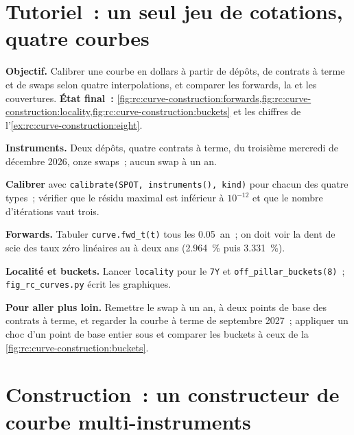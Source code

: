 \section{Tutoriel~: un seul jeu de cotations, quatre courbes}\label{tut:rc:curve-construction:tutorial}

\begin{tutorial}
\textbf{Objectif.} Calibrer une courbe en dollars à partir de dépôts, de contrats à terme et de swaps
selon quatre interpolations, et comparer les forwards, la  et les couvertures.
\textbf{État final~:}
\cref{fig:rc:curve-construction:forwards,fig:rc:curve-construction:locality,fig:rc:curve-construction:buckets}
et les chiffres de l'\cref{ex:rc:curve-construction:eight}.
\begin{tutsteps}
\item \textbf{Instruments.} Deux dépôts, quatre contrats à terme, du troisième
mercredi de décembre 2026, onze swaps~; aucun swap à un an.
\label{lst:rc:curve-construction:instruments}
\item \textbf{Calibrer} avec \texttt{calibrate(SPOT, instruments(), kind)} pour chacun
des quatre types~; vérifier que le résidu maximal est inférieur à $10^{-12}$ et que le
nombre d'itérations vaut trois.
\item \textbf{Forwards.} Tabuler \texttt{curve.fwd\_t(t)} tous les 0.05~an~; on
doit voir la dent de scie des taux zéro linéaires au  à deux ans (2.964~\% puis
3.331~\%).
\item \textbf{Localité et buckets.} Lancer \texttt{locality} pour le  \texttt{7Y} et
\texttt{off\_pillar\_buckets(8)}~; \texttt{fig\_rc\_curves.py} écrit les graphiques.
\end{tutsteps}
\textbf{Pour aller plus loin.} Remettre le swap à un an, à deux points de base
des contrats à terme, et regarder la courbe à terme de septembre 2027~; appliquer un choc d'un point de base entier
sous  et comparer les buckets à ceux de
la \cref{fig:rc:curve-construction:buckets}.
\end{tutorial}

\section{Construction~: un constructeur de courbe multi-instruments}\label{bld:rc:curve-construction:curvebuild}

